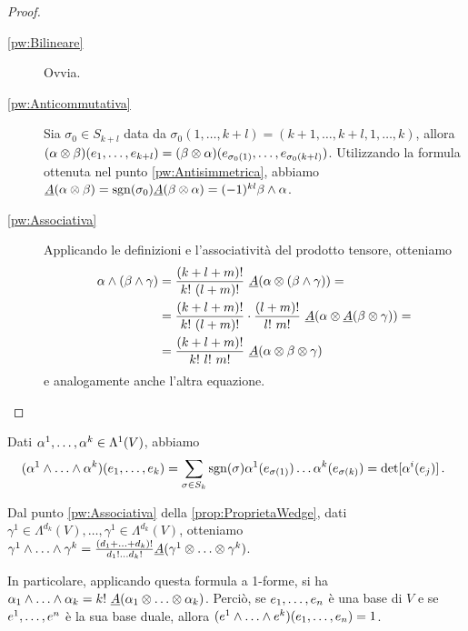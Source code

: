 \begin{proof}
\begin{description}
	\item [\ref{pw:Bilineare}] Ovvia.

	\item [\ref{pw:Anticommutativa}]
	Sia $\sigma_0\in S_{k+l}$ data da $\sigma_0(1,\ldots,k+l) = (k+1,\ldots,k+l,1,\ldots,k)$, allora $(\alpha\otimes \beta)(\seqb{e}{k+l}{,}) = (\beta\otimes \alpha)(e_{\sigma_0(1)},\ldots,e_{\sigma_0(k+l)})$.
	Utilizzando la formula ottenuta nel punto \ref{pw:Antisimmetrica}, abbiamo $\antisimm(\alpha\otimes\beta) = \sgn(\sigma_0) \antisimm(\beta\otimes\alpha)=(-1)^{kl} \beta \wedge \alpha$.

	\item [\ref{pw:Associativa}]
	Applicando le definizioni e l'associatività del prodotto tensore, otteniamo
	\begin{align*}
	\alpha\wedge(\beta\wedge\gamma) &= \frac{(k+l+m)!}{k!\ (l+m)!}\ \antisimm(\alpha\otimes(\beta\wedge\gamma)) =\\
	&=\frac{(k+l+m)!}{k!\ (l+m)!}\cdot \frac{(l+m)!}{l!\ m!}\ \antisimm(\alpha\otimes\antisimm(\beta\otimes\gamma))=\\
	&=\frac{(k+l+m)!}{k!\ l!\ m!}\ \antisimm(\alpha\otimes\beta\otimes\gamma)
	\end{align*}
	e analogamente anche l'altra equazione.

	\end{description}
\end{proof}


\begin{remark}
	Dati $\seqa{\alpha}{k}{,}\in\Lambda^1(V)$, abbiamo
	\begin{equation*}
		(\seqa{\alpha}{k}{\wedge})(\seqb{e}{k}{,}) = \sum_{\sigma\in S_k} \sgn(\sigma) \alpha^1(e_{\sigma(1)}) \ldots \alpha^k(e_{\sigma(k)}) = \det[\alpha^i(e_j)] \punto
	\end{equation*}
\end{remark}
\begin{remark}
	Dal punto \ref{pw:Associativa} della \cref{prop:ProprietaWedge}, dati $\gamma^1\in \Lambda^{d_k}(V),\ldots, \gamma^1\in \Lambda^{d_k}(V)$, otteniamo $\seqa{\gamma}{k}{\wedge} = \frac{(\seqb{d}{k}{+})!}{d_1!\ldots d_k!}\antisimm (\seqa{\gamma}{k}{\otimes})$.
	
	In particolare, applicando questa formula a 1-forme, si ha $\seqb{\alpha}{k}{\wedge} = k!\ \antisimm(\seqb{\alpha}{k}{\otimes})$.
	Perciò, se $\seqb en,$ è una base di $V$ e se $\seqa en,$ è la sua base duale, allora $(\seqa ek\wedge)(\seqb en,) = 1$.

\end{remark}

